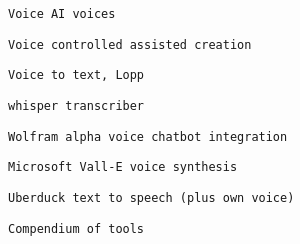          
         
          \protect\hypertarget{ID_651382301}{}{}

\begin{verbatim}
Voice AI voices
\end{verbatim}
         

         
         
          \protect\hypertarget{ID_193415739}{}{}

\begin{verbatim}
Voice controlled assisted creation
\end{verbatim}
         

         
         
          \protect\hypertarget{ID_1796388227}{}{}

\begin{verbatim}
Voice to text, Lopp
\end{verbatim}
         

         
         
          \protect\hypertarget{ID_169301393}{}{}

\begin{verbatim}
whisper transcriber
\end{verbatim}
         

         
         
          \protect\hypertarget{ID_52714737}{}{}

\begin{verbatim}
Wolfram alpha voice chatbot integration
\end{verbatim}
         

         
         
          \protect\hypertarget{ID_212199505}{}{}

\begin{verbatim}
Microsoft Vall-E voice synthesis
\end{verbatim}
         

         
         
          \protect\hypertarget{ID_800118933}{}{}

\begin{verbatim}
Uberduck text to speech (plus own voice)
\end{verbatim}
         
       

       
       
        \protect\hypertarget{ID_1001579744}{}{}

\begin{verbatim}
Compendium of tools
\end{verbatim}
       


